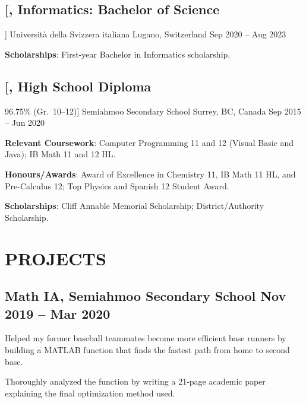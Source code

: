\documentclass{article}
\newcommand{\datedsubsection}[4][]{
    \subsection*{
        \textbf{\large #2}, #3 \hfill #4
    } %
    \vspace{-4pt} %
    #1 %
}
\begin{document}
{    %
    
    \datedsubsection
        [\textit{Informatics: Bachelor of Science}]
        {Universit\`a della Svizzera italiana}
        {Lugano, Switzerland}
        {Sep 2020 -- Aug 2023}
    
    \begin{compactitem}
    
    \item\textbf{Scholarships}:
    First-year Bachelor in Informatics scholarship.
    
    \end{compactitem}
    
    
    
    \datedsubsection
        [\textit{High School Diploma} 
        \hfill 96.75\% (Gr.\ 10--12)]
        {Semiahmoo Secondary School}
        {Surrey, BC, Canada}
        {Sep 2015 -- Jun 2020}
    
    \begin{compactitem}
    
    \item\textbf{Relevant Coursework}:
    Computer Programming 11 and 12 (Visual Basic and Java);
    IB Math 11 and 12 HL.
    
    \item\textbf{Honours/Awards}:
    Award of Excellence in Chemistry 11, IB Math 11 HL, and Pre-Calculus 12;
    Top Physics and Spanish 12 Student Award.
    
    \item\textbf{Scholarships}:
    Cliff Annable Memorial Scholarship;
    District/Authority Scholarship.
    
    \end{compactitem}
    
    
    
    
    \section{PROJECTS}
    
    
    \datedsubsection{Math IA}
                    {Semiahmoo Secondary School}
                    {Nov 2019 -- Mar 2020}
    
    \begin{compactitem}
    \item Helped my former baseball teammates become more efficient base runners by building a MATLAB function that finds the fastest path from home to second base.
    \item Thoroughly analyzed the function by writing a 21-page academic paper explaining the final optimization method used.
    \end{compactitem}
    
}
\end{document}
